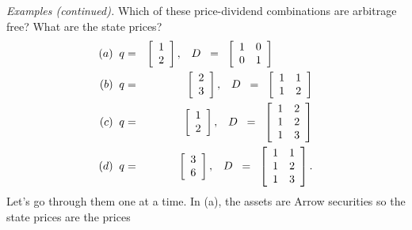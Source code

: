 \documentclass[11pt]{article}
\begin{document}
{\it Examples (continued).\/}
Which of these price-dividend combinations are arbitrage free?
What are the state prices?
\begin{eqnarray*}
  (a) \;\;  q &=& \left[
            \begin{array}{c}
             1 \\ 2
            \end{array}
          \right], \;\;\;
        D \;\;=\;\;
            \left[
            \begin{array}{cc}
             1 & 0 \\ 0 & 1
            \end{array}
          \right]    \hspace*{0.5in}  \\
  (b) \;\;  q &=& \left[
            \begin{array}{c}
             2 \\ 3
            \end{array}
          \right], \;\;\;
        D \;\;=\;\;
            \left[
            \begin{array}{cc}
             1 & 1 \\ 1 & 2
            \end{array}
          \right]      \\
   (c) \;\;  q &=& \left[
            \begin{array}{c}
             1 \\ 2
            \end{array}
          \right], \;\;\;
        D \;\;=\;\;
            \left[
            \begin{array}{cc}
             1 & 2 \\ 1 & 2 \\ 1 & 3
            \end{array}
          \right]    \\
  (d) \;\;    q &=& \left[
            \begin{array}{c}
             3 \\ 6
            \end{array}
          \right], \;\;\;
        D \;\;=\;\;
            \left[
            \begin{array}{cc}
             1 & 1 \\ 1 & 2 \\ 1 & 3
            \end{array}
          \right]    .
\end{eqnarray*}
Let's go through them one at a time.
In (a), the assets are Arrow securities so the state prices are the prices
\end{document}
